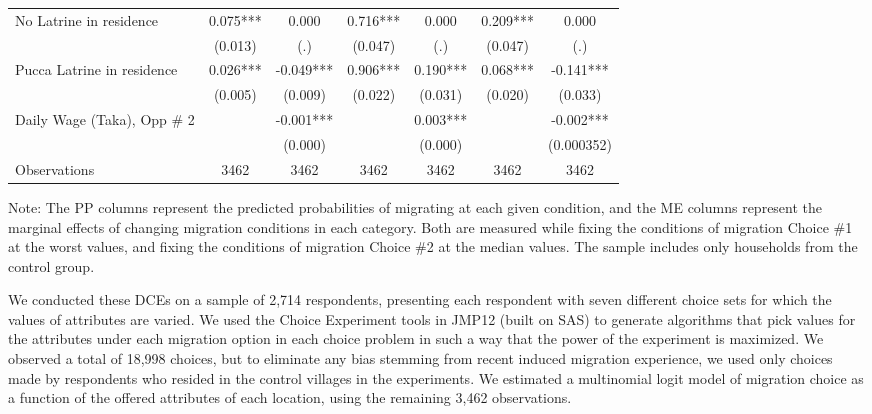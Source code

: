 \documentclass[12pt,pdftex]{article}
\begin{document}
\begin{table}[!t]
\begin{center}
\begin{tabular}{l c c | c c | c c}
No Latrine in residence&      0.075***&           0.000   &       0.716***&           0.000   &       0.209***&           0.000   \\
            &    (0.013)   &         (.)   &    (0.047)   &         (.)   &    (0.047)   &         (.)   \\
Pucca Latrine in residence&      0.026***&     -0.049***&       0.906***&       0.190***&      0.068***&      -0.141***\\
            &   (0.005)   &   (0.009)   &    (0.022)   &    (0.031)   &    (0.020)   &    (0.033)   \\
Daily Wage (Taka), Opp \# 2&               &    -0.001***&               &     0.003***&               &    -0.002***\\
            &               &  (0.000)   &               &  (0.000)   &               &  (0.000352)   \\
\hline
Observations&        3462   &        3462   &        3462   &        3462   &        3462   &        3462   \\
\hline
\end{tabular}
\parbox[c]{6.5in}{%
{\footnotesize  \vspace{0.1cm} Note: The PP columns represent the predicted probabilities of migrating at each given condition, and the ME columns represent the marginal effects of changing migration conditions in each category. Both are measured while fixing the conditions of migration Choice \#1 at the worst values, and fixing the conditions of migration Choice \#2 at the median values. The sample includes only households from the control group.}
}
\end{center}
\end{table}

We conducted these DCEs on a sample of 2,714 respondents, presenting each respondent with seven different choice sets for which the values of attributes are varied. We used the Choice Experiment tools in JMP12 (built on SAS) to generate algorithms that pick values for the attributes under each migration option in each choice problem in such a way that the power of the experiment is maximized. We observed a total of 18,998 choices, but to eliminate any bias stemming from recent induced migration experience, we used only choices made by respondents who resided in the control villages in the experiments. We estimated a multinomial logit model of migration choice as a function of the offered attributes of each location, using the remaining 3,462 observations.
\end{document}
